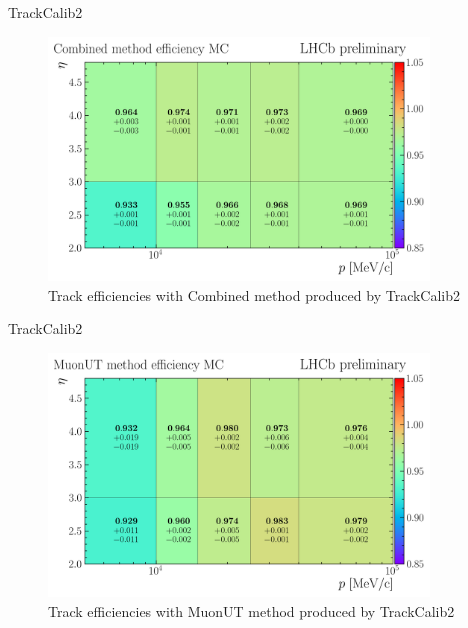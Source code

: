 \documentclass[xcolor={dvipsnames}]{beamer}
\begin{document}
\begin{frame}{TrackCalib2}
  \vspace{0.0cm}
  \begin{figure}[htb]
    \centering
    \includegraphics[width=0.9\textwidth]{Plots/trackEff_MC_Sim10d_2024_Block1_Combined_P-ETA.png}
    \caption*{\small Track efficiencies with Combined method produced by TrackCalib2}
  \end{figure}
\end{frame}

\begin{frame}{TrackCalib2}
  \vspace{0.0cm}
  \begin{figure}[htb]
    \centering
    \includegraphics[width=0.9\textwidth]{Plots/trackEff_MC_Sim10d_2024_Block1_MuonUT_P-ETA.png}
    \caption*{\small Track efficiencies with MuonUT method produced by TrackCalib2}
  \end{figure}
\end{frame}
\end{document}
